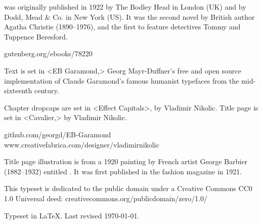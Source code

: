 \documentclass[
paper=5.5in:8.5in,
]{scrbook}
\begin{document}
\vfill
\begin{minipage}{\textwidth}
 was originally published in 1922 by The Bodley Head in London (UK) and by Dodd, Mead \& Co. in New York (US).  It was the second novel by British author Agatha Christie (1890--1976), and the first to feature detectives Tommy and Tuppence Beresford.
\end{minipage}
\vfill
gutenberg.org/ebooks/78220
\vfill
\divider
\vfill
\begin{minipage}{\textwidth}
Text is set in <EB Garamond,> Georg Mayr-Duffner's free and open source implementation of Claude Garamond’s famous humanist typefaces from the mid-sixteenth century.

Chapter dropcaps are set in <Effect Capitals>, by Vladimir Nikolic. Title page is set in <Cavalier,> by Vladimir Nikolic.
\end{minipage}
\vfill
github.com/georgd/EB-Garamond\\www.creativefabrica.com/designer/vladimirnikolic
\vfill
\divider
\vfill
\begin{minipage}{\textwidth}
Title page illustration is from a 1920 painting by French artist George Barbier (1882--1932) entitled . It was first published in the fashion magazine  in 1921.
\end{minipage}
\vfill
\divider
\vfill
\begin{minipage}{\textwidth}
This typeset is dedicated to the public domain under a Creative Commons CC0 1.0 Universal deed: creativecommons.org/publicdomain/zero/1.0/\\
\end{minipage}
\vfill
\divider
\vfill
Typeset in \LaTeX{}. Last revised \today.
\thispagestyle{empty}
\end{document}
